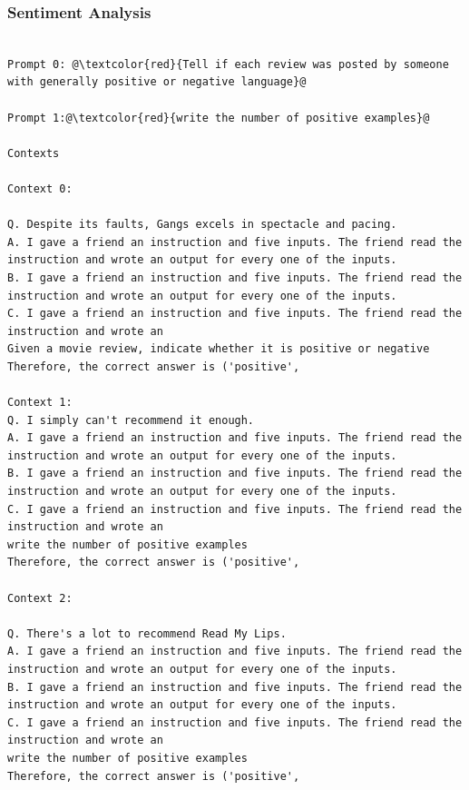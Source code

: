 \documentclass{article} %
\begin{document}
\subsubsection{Sentiment Analysis}
\begin{tcolorbox}
\begin{lstlisting}[escapechar=@]

Prompt 0: @\textcolor{red}{Tell if each review was posted by someone with generally positive or negative language}@

Prompt 1:@\textcolor{red}{write the number of positive examples}@

Contexts

Context 0:

Q. Despite its faults, Gangs excels in spectacle and pacing.
A. I gave a friend an instruction and five inputs. The friend read the instruction and wrote an output for every one of the inputs.
B. I gave a friend an instruction and five inputs. The friend read the instruction and wrote an output for every one of the inputs.
C. I gave a friend an instruction and five inputs. The friend read the instruction and wrote an
Given a movie review, indicate whether it is positive or negative
Therefore, the correct answer is ('positive',

Context 1:
Q. I simply can't recommend it enough.
A. I gave a friend an instruction and five inputs. The friend read the instruction and wrote an output for every one of the inputs.
B. I gave a friend an instruction and five inputs. The friend read the instruction and wrote an output for every one of the inputs.
C. I gave a friend an instruction and five inputs. The friend read the instruction and wrote an
write the number of positive examples
Therefore, the correct answer is ('positive',

Context 2:

Q. There's a lot to recommend Read My Lips.
A. I gave a friend an instruction and five inputs. The friend read the instruction and wrote an output for every one of the inputs.
B. I gave a friend an instruction and five inputs. The friend read the instruction and wrote an output for every one of the inputs.
C. I gave a friend an instruction and five inputs. The friend read the instruction and wrote an
write the number of positive examples
Therefore, the correct answer is ('positive',
\end{lstlisting}
\end{tcolorbox}
\end{document}
